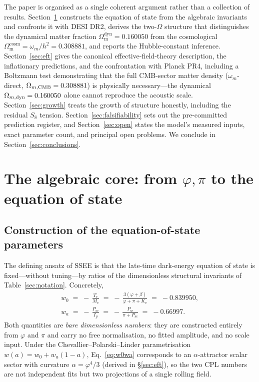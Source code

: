 \documentclass[aps,prd,preprint,amsmath,amssymb,nofootinbib,longbibliography]{revtex4-2}
\newcommand{\Om}{\Omega_{\mathrm{m}}}
\begin{document}
The paper is organised as a single coherent argument rather than a collection of
results. Section~\ref{sec:core} constructs the equation of state from the
algebraic invariants and confronts it with DESI DR2, derives the two-$\Omega$
structure that distinguishes the dynamical matter fraction
$\Om^{\mathrm{dyn}}=0.160050$ from the cosmological $\Om^{\mathrm{cosm}}=\omega_m/h^2=0.308881$, and
reports the Hubble-constant inference. Section~\ref{sec:eft} gives the canonical
effective-field-theory description, the inflationary predictions, and the
confrontation with Planck PR4, including a Boltzmann test demonstrating that the
full CMB-sector matter density ($\omega_m$-direct, $\Omega_{m,\rm CMB}=0.308881$) is
physically necessary---the dynamical $\Omega_{m,\rm dyn}=0.160050$ alone cannot
reproduce the acoustic scale. Section~\ref{sec:growth} treats
the growth of structure honestly, including the residual $S_8$ tension.
Section~\ref{sec:falsifiability} sets out the pre-committed prediction register,
and Section~\ref{sec:open} states the model's measured inputs, exact parameter
count, and principal open problems. We conclude in
Section~\ref{sec:conclusions}.

\section{The algebraic core: from $\varphi,\pi$ to the equation of state}
\label{sec:core}

\subsection{Construction of the equation-of-state parameters}
\label{sec:w0wa-construction}
The defining ansatz of SSEE is that the late-time dark-energy equation of
state is fixed---without tuning---by ratios of the dimensionless structural
invariants of Table~\ref{sec:notation}. Concretely,
\begin{equation}
\begin{gathered}
  w_0 \;=\; -\,\frac{T_r}{M_v}
        \;=\; -\,\frac{3(\varphi+\beta)}{\varphi+\pi+K_v}
        \;=\; -0.839950, \\[3pt]
  w_a \;=\; -\,\frac{P_{\mathrm{sc}}}{I_g}
        \;=\; -\,\frac{P_{\mathrm{sc}}}{\pi+P_{\mathrm{sc}}}
        \;=\; -0.66997 .
\end{gathered}
  \label{eq:w0wa}
\end{equation}
Both quantities are \emph{bare dimensionless numbers}: they are constructed
entirely from $\varphi$ and $\pi$ and carry no free normalisation, no fitted
amplitude, and no scale input. Under the Chevallier--Polarski--Linder
parametrisation $w(a)=w_0+w_a(1-a)$, Eq.~\eqref{eq:w0wa} corresponds to an
$\alpha$-attractor scalar sector with curvature $\alpha=\varphi^4/3$ (derived
in \S\ref{sec:eft}), so the two CPL numbers are not independent fits but two
projections of a single rolling field.
\end{document}
